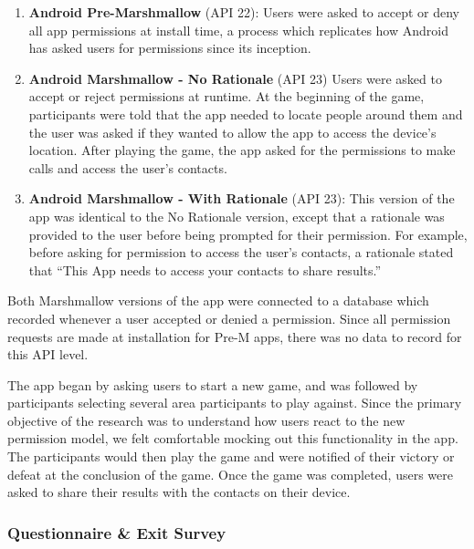 \documentclass{sig-alternate-05-2015}
\begin{document}
\begin{enumerate}

    \item  \textbf{Android Pre-Marshmallow} (API 22): Users were asked to accept or deny all app permissions at install time, a process which replicates how Android has asked users for permissions since its inception.

    \item  \textbf{Android Marshmallow - No Rationale} (API 23) Users were asked to accept or reject permissions at runtime. At the beginning of the game, participants were told that the app needed to locate people around them and the user was asked if they wanted to allow the app to access the device's location. After playing the game, the app asked for the permissions to make calls and access the user's contacts.

    \item  \textbf{Android Marshmallow - With Rationale} (API 23): This version of the app was identical to the No Rationale version, except that a rationale was provided to the user before being prompted for their permission. For example, before asking for permission to access the user's contacts, a rationale stated that ``This App needs to access your contacts to share results.''

\end{enumerate}

Both Marshmallow versions of the app were connected to a database which recorded whenever a user accepted or denied a permission. Since all permission requests are made at installation for Pre-M apps, there was no data to record for this API level.

The app began by asking users to start a new game, and was followed by participants selecting several area participants to play against. Since the primary objective of the research was to understand how users react to the new permission model, we felt comfortable mocking out this functionality in the app. The participants would then play the game and were notified of their victory or defeat at the conclusion of the game. Once the game was completed, users were asked to share their results with the contacts on their device.

\subsubsection{Questionnaire \& Exit Survey}
\end{document}
